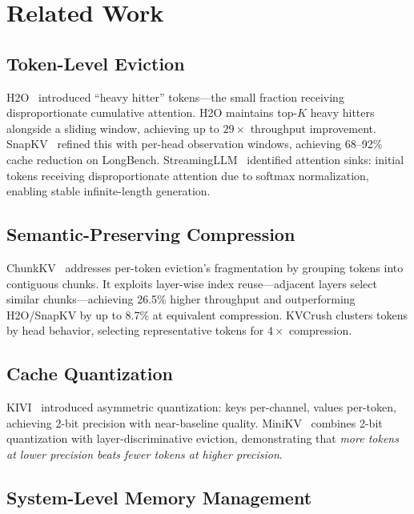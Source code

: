 \documentclass[conference]{IEEEtran}
\begin{document}
\section{Related Work}

\subsection{Token-Level Eviction}

H2O~\cite{h2o} introduced ``heavy hitter'' tokens---the small fraction receiving disproportionate cumulative attention. H2O maintains top-$K$ heavy hitters alongside a sliding window, achieving up to $29\times$ throughput improvement. SnapKV~\cite{snapkv} refined this with per-head observation windows, achieving 68--92\% cache reduction on LongBench. StreamingLLM~\cite{streamingllm} identified attention sinks: initial tokens receiving disproportionate attention due to softmax normalization, enabling stable infinite-length generation.

\subsection{Semantic-Preserving Compression}

ChunkKV~\cite{chunkkv} addresses per-token eviction's fragmentation by grouping tokens into contiguous chunks. It exploits layer-wise index reuse---adjacent layers select similar chunks---achieving 26.5\% higher throughput and outperforming H2O/SnapKV by up to 8.7\% at equivalent compression. KVCrush clusters tokens by head behavior, selecting representative tokens for $4\times$ compression.

\subsection{Cache Quantization}

KIVI~\cite{kivi} introduced asymmetric quantization: keys per-channel, values per-token, achieving 2-bit precision with near-baseline quality. MiniKV~\cite{minikv} combines 2-bit quantization with layer-discriminative eviction, demonstrating that \textit{more tokens at lower precision beats fewer tokens at higher precision}.

\subsection{System-Level Memory Management}
\end{document}
